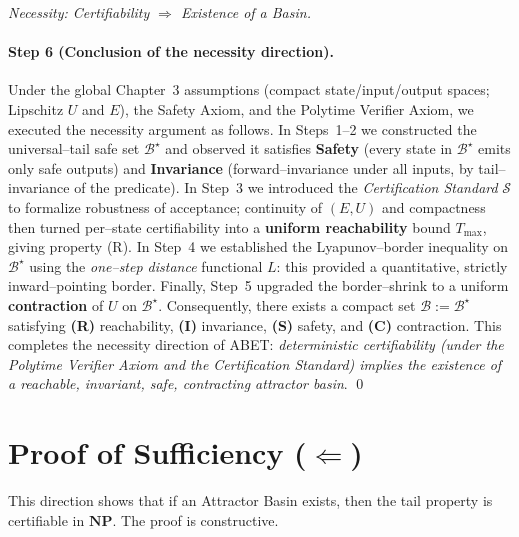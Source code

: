 \documentclass[12pt]{article}
\theoremstyle{definition}
\theoremstyle{plain}
\begin{document}
\begin{proof}[Necessity: Certifiability $\Rightarrow$ Existence of a Basin]
\paragraph{Step 6 (Conclusion of the necessity direction).}
Under the global Chapter~3 assumptions (compact state/input/output spaces; Lipschitz $U$ and $E$), the Safety Axiom, and the Polytime Verifier Axiom, we executed the necessity argument as follows. In Steps~1–2 we constructed the universal–tail safe set $\mathcal B^\star$ and observed it satisfies \textbf{Safety} (every state in $\mathcal B^\star$ emits only safe outputs) and \textbf{Invariance} (forward–invariance under all inputs, by tail–invariance of the predicate). In Step~3 we introduced the \emph{Certification Standard} $\mathcal S$ to formalize robustness of acceptance; continuity of $(E,U)$ and compactness then turned per–state certifiability into a \textbf{uniform reachability} bound $T_{\max}$, giving property (R). In Step~4 we established the Lyapunov–border inequality on $\mathcal B^\star$ using the \emph{one–step distance} functional $L$: this provided a quantitative, strictly inward–pointing border. Finally, Step~5 upgraded the border–shrink to a uniform \textbf{contraction} of $U$ on $\mathcal B^\star$. Consequently, there exists a compact set $\mathcal B:=\mathcal B^\star$ satisfying \textbf{(R)} reachability, \textbf{(I)} invariance, \textbf{(S)} safety, and \textbf{(C)} contraction. This completes the necessity direction of ABET: \emph{deterministic certifiability (under the Polytime Verifier Axiom and the Certification Standard) implies the existence of a reachable, invariant, safe, contracting attractor basin}.
\qed



\end{proof}

\section{Proof of Sufficiency ($\Leftarrow$)}
This direction shows that if an Attractor Basin exists, then the tail property is certifiable in $\mathbf{NP}$. The proof is constructive.
\end{document}
